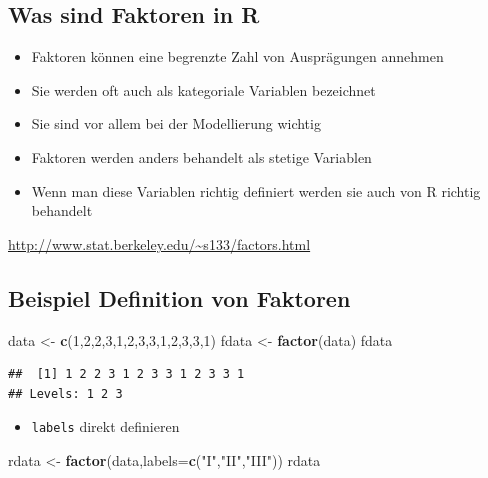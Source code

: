 \documentclass[]{article}
\newenvironment{Shaded}{\begin{snugshade}}{\end{snugshade}}
\newcommand{\KeywordTok}[1]{\textcolor[rgb]{0.13,0.29,0.53}{\textbf{{#1}}}}
\newcommand{\DataTypeTok}[1]{\textcolor[rgb]{0.13,0.29,0.53}{{#1}}}
\newcommand{\DecValTok}[1]{\textcolor[rgb]{0.00,0.00,0.81}{{#1}}}
\newcommand{\StringTok}[1]{\textcolor[rgb]{0.31,0.60,0.02}{{#1}}}
\newcommand{\NormalTok}[1]{{#1}}
\providecommand{\tightlist}{%
  \setlength{\itemsep}{0pt}\setlength{\parskip}{0pt}}
\begin{document}
\subsection{Was sind Faktoren in R}\label{was-sind-faktoren-in-r}

\begin{itemize}
\tightlist
\item
  Faktoren können eine begrenzte Zahl von Ausprägungen annehmen
\item
  Sie werden oft auch als kategoriale Variablen bezeichnet
\item
  Sie sind vor allem bei der Modellierung wichtig
\item
  Faktoren werden anders behandelt als stetige Variablen
\item
  Wenn man diese Variablen richtig definiert werden sie auch von R
  richtig behandelt
\end{itemize}

\url{http://www.stat.berkeley.edu/~s133/factors.html}

\subsection{Beispiel Definition von
Faktoren}\label{beispiel-definition-von-faktoren}

\begin{Shaded}
\begin{Highlighting}[]
\NormalTok{data <-}\StringTok{ }\KeywordTok{c}\NormalTok{(}\DecValTok{1}\NormalTok{,}\DecValTok{2}\NormalTok{,}\DecValTok{2}\NormalTok{,}\DecValTok{3}\NormalTok{,}\DecValTok{1}\NormalTok{,}\DecValTok{2}\NormalTok{,}\DecValTok{3}\NormalTok{,}\DecValTok{3}\NormalTok{,}\DecValTok{1}\NormalTok{,}\DecValTok{2}\NormalTok{,}\DecValTok{3}\NormalTok{,}\DecValTok{3}\NormalTok{,}\DecValTok{1}\NormalTok{)}
\NormalTok{fdata <-}\StringTok{ }\KeywordTok{factor}\NormalTok{(data)}
\NormalTok{fdata}
\end{Highlighting}
\end{Shaded}

\begin{verbatim}
##  [1] 1 2 2 3 1 2 3 3 1 2 3 3 1
## Levels: 1 2 3
\end{verbatim}

\begin{itemize}
\tightlist
\item
  \texttt{labels} direkt definieren
\end{itemize}

\begin{Shaded}
\begin{Highlighting}[]
\NormalTok{rdata <-}\StringTok{ }\KeywordTok{factor}\NormalTok{(data,}\DataTypeTok{labels=}\KeywordTok{c}\NormalTok{(}\StringTok{"I"}\NormalTok{,}\StringTok{"II"}\NormalTok{,}\StringTok{"III"}\NormalTok{))}
\NormalTok{rdata}
\end{Highlighting}
\end{Shaded}
\end{document}
